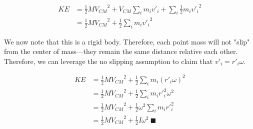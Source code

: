 \documentclass[letterpaper]{article}
\begin{document}
\begin{align}
   KE &= \frac{1}{2}  M {V_{CM}}^2+ V_{CM}\sum_i  m_i v'_i+\sum_i  \frac{1}{2} m_i {v'_i}^2 \\
   &= \frac{1}{2}  M {V_{CM}}^2+\frac{1}{2} \sum_i m_i {v'_i}^2 
\end{align}

We now note that this is a rigid body. Therefore, each point mass will not "slip" from the center of mass---they remain the same distance relative each other. Therefore, we can leverage the no slipping assumption to claim that \(v'_i = r'_i \omega\).

\begin{align}
   KE &= \frac{1}{2}  M {V_{CM}}^2+\frac{1}{2} \sum_i m_i ( r'_i \omega )^2 \\ 
   &= \frac{1}{2}  M {V_{CM}}^2+\frac{1}{2} \sum_i m_i r'_i^2 \omega^2  \\
   &= \frac{1}{2}  M {V_{CM}}^2+\frac{1}{2} \omega^2 \sum_i m_i r'_i^2   \\
   &= \frac{1}{2}  M {V_{CM}}^2+\frac{1}{2} I \omega^2\ \blacksquare
\end{align}
\end{document}
